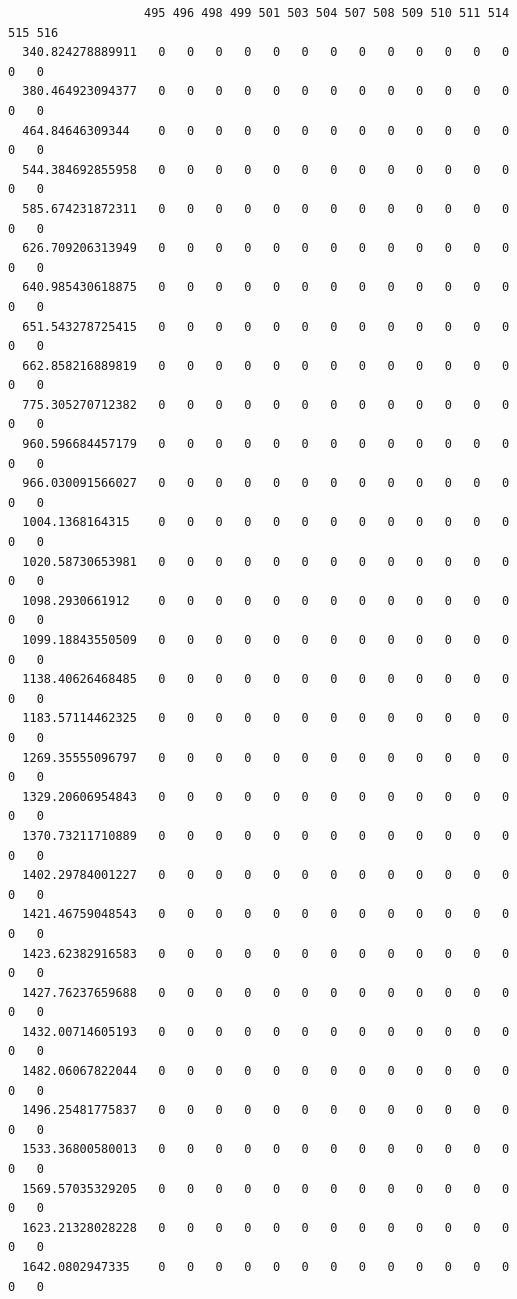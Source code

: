 \documentclass[
  letterpaper,
  DIV=11,
  numbers=noendperiod]{scrartcl}
\begin{document}
\begin{verbatim}
                   495 496 498 499 501 503 504 507 508 509 510 511 514 515 516
  340.824278889911   0   0   0   0   0   0   0   0   0   0   0   0   0   0   0
  380.464923094377   0   0   0   0   0   0   0   0   0   0   0   0   0   0   0
  464.84646309344    0   0   0   0   0   0   0   0   0   0   0   0   0   0   0
  544.384692855958   0   0   0   0   0   0   0   0   0   0   0   0   0   0   0
  585.674231872311   0   0   0   0   0   0   0   0   0   0   0   0   0   0   0
  626.709206313949   0   0   0   0   0   0   0   0   0   0   0   0   0   0   0
  640.985430618875   0   0   0   0   0   0   0   0   0   0   0   0   0   0   0
  651.543278725415   0   0   0   0   0   0   0   0   0   0   0   0   0   0   0
  662.858216889819   0   0   0   0   0   0   0   0   0   0   0   0   0   0   0
  775.305270712382   0   0   0   0   0   0   0   0   0   0   0   0   0   0   0
  960.596684457179   0   0   0   0   0   0   0   0   0   0   0   0   0   0   0
  966.030091566027   0   0   0   0   0   0   0   0   0   0   0   0   0   0   0
  1004.1368164315    0   0   0   0   0   0   0   0   0   0   0   0   0   0   0
  1020.58730653981   0   0   0   0   0   0   0   0   0   0   0   0   0   0   0
  1098.2930661912    0   0   0   0   0   0   0   0   0   0   0   0   0   0   0
  1099.18843550509   0   0   0   0   0   0   0   0   0   0   0   0   0   0   0
  1138.40626468485   0   0   0   0   0   0   0   0   0   0   0   0   0   0   0
  1183.57114462325   0   0   0   0   0   0   0   0   0   0   0   0   0   0   0
  1269.35555096797   0   0   0   0   0   0   0   0   0   0   0   0   0   0   0
  1329.20606954843   0   0   0   0   0   0   0   0   0   0   0   0   0   0   0
  1370.73211710889   0   0   0   0   0   0   0   0   0   0   0   0   0   0   0
  1402.29784001227   0   0   0   0   0   0   0   0   0   0   0   0   0   0   0
  1421.46759048543   0   0   0   0   0   0   0   0   0   0   0   0   0   0   0
  1423.62382916583   0   0   0   0   0   0   0   0   0   0   0   0   0   0   0
  1427.76237659688   0   0   0   0   0   0   0   0   0   0   0   0   0   0   0
  1432.00714605193   0   0   0   0   0   0   0   0   0   0   0   0   0   0   0
  1482.06067822044   0   0   0   0   0   0   0   0   0   0   0   0   0   0   0
  1496.25481775837   0   0   0   0   0   0   0   0   0   0   0   0   0   0   0
  1533.36800580013   0   0   0   0   0   0   0   0   0   0   0   0   0   0   0
  1569.57035329205   0   0   0   0   0   0   0   0   0   0   0   0   0   0   0
  1623.21328028228   0   0   0   0   0   0   0   0   0   0   0   0   0   0   0
  1642.0802947335    0   0   0   0   0   0   0   0   0   0   0   0   0   0   0

\end{verbatim}
\end{document}
